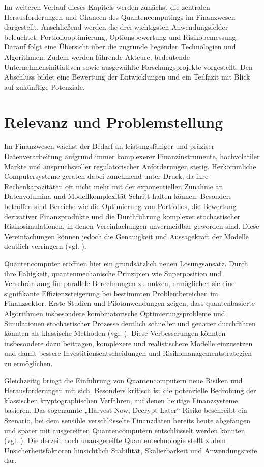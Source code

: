 Im weiteren Verlauf dieses Kapitels werden zunächst die zentralen Herausforderungen und Chancen des Quantencomputings im Finanzwesen dargestellt. Anschließend werden die drei wichtigsten Anwendungsfelder beleuchtet: Portfoliooptimierung, Optionsbewertung und Risikobemessung. Darauf folgt eine Übersicht über die zugrunde liegenden Technologien und Algorithmen. Zudem werden führende Akteure, bedeutende Unternehmensinitiativen sowie ausgewählte Forschungsprojekte vorgestellt. Den Abschluss bildet eine Bewertung der Entwicklungen und ein Teilfazit mit Blick auf zukünftige Potenziale.

\section{Relevanz und Problemstellung}
Im Finanzwesen wächst der Bedarf an leistungsfähiger und präziser Datenverarbeitung aufgrund immer komplexerer Finanzinstrumente, hochvolatiler Märkte und anspruchsvoller regulatorischer Anforderungen stetig. Herkömmliche Computersysteme geraten dabei zunehmend unter Druck, da ihre Rechenkapazitäten oft nicht mehr mit der exponentiellen Zunahme an Datenvolumina und Modellkomplexität Schritt halten können. Besonders betroffen sind Bereiche wie die Optimierung von Portfolios, die Bewertung derivativer Finanzprodukte und die Durchführung komplexer stochastischer Risikosimulationen, in denen Vereinfachungen unvermeidbar geworden sind. Diese Vereinfachungen können jedoch die Genauigkeit und Aussagekraft der Modelle deutlich verringern (vgl. \cite{egger_quantum_2020}).

Quantencomputer eröffnen hier ein grundsätzlich neuen Lösungsansatz. Durch ihre Fähigkeit, quantenmechanische Prinzipien wie Superposition und Verschränkung für parallele Berechnungen zu nutzen, ermöglichen sie eine signifikante Effizienzsteigerung bei bestimmten Problembereichen im Finanzsektor. Erste Studien und Pilotanwendungen zeigen, dass quantenbasierte Algorithmen insbesondere kombinatorische Optimierungsprobleme und Simulationen stochastischer Prozesse deutlich schneller und genauer durchführen könnten als klassische Methoden (vgl. \cite{orus_quantum_2019, woerner und egger}). Diese Verbesserungen könnten insbesondere dazu beitragen, komplexere und realistischere Modelle einzusetzen und damit bessere Investitionsentscheidungen und Risikomanagementstrategien zu ermöglichen.

Gleichzeitig bringt die Einführung von Quantencomputern neue Risiken und Herausforderungen mit sich. Besonders kritisch ist die potenzielle Bedrohung der klassischen kryptographischen Verfahren, auf denen heutige Finanzsysteme basieren. Das sogenannte „Harvest Now, Decrypt Later“-Risiko beschreibt ein Szenario, bei dem sensible verschlüsselte Finanzdaten bereits heute abgefangen und später mit ausgereiften Quantencomputern entschlüsselt werden könnten (vgl. \cite{mosca_et_al_cybersecurity_2018}). Die derzeit noch unausgereifte Quantentechnologie stellt zudem Unsicherheitsfaktoren hinsichtlich Stabilität, Skalierbarkeit und Anwendungsreife dar.

